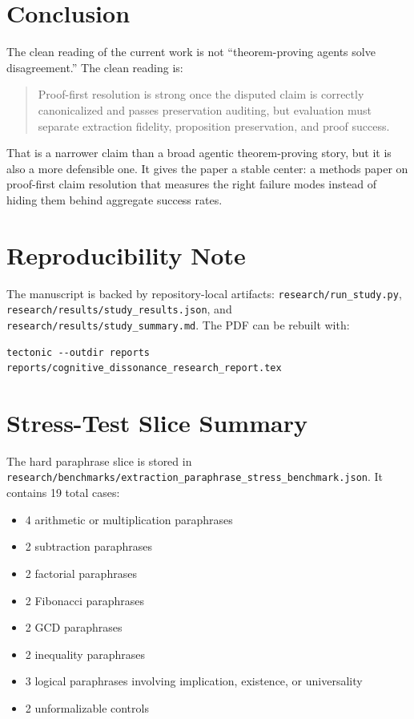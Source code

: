 \documentclass[11pt]{article}
\begin{document}
\section{Conclusion}

The clean reading of the current work is not ``theorem-proving agents solve
disagreement.'' The clean reading is:

\begin{quote}
Proof-first resolution is strong once the disputed claim is correctly
canonicalized and passes preservation auditing, but evaluation must separate
extraction fidelity, proposition preservation, and proof success.
\end{quote}

That is a narrower claim than a broad agentic theorem-proving story, but it is
also a more defensible one. It gives the paper a stable center: a methods
paper on proof-first claim resolution that measures the right failure modes
instead of hiding them behind aggregate success rates.

\section*{Reproducibility Note}

The manuscript is backed by repository-local artifacts:
\nolinkurl{research/run_study.py},
\nolinkurl{research/results/study_results.json}, and
\nolinkurl{research/results/study_summary.md}. The PDF can be rebuilt with:

\begin{verbatim}
tectonic --outdir reports reports/cognitive_dissonance_research_report.tex
\end{verbatim}

\appendix

\section{Stress-Test Slice Summary}

The hard paraphrase slice is stored in
\nolinkurl{research/benchmarks/extraction_paraphrase_stress_benchmark.json}.
It contains 19 total cases:

\begin{itemize}
  \item 4 arithmetic or multiplication paraphrases
  \item 2 subtraction paraphrases
  \item 2 factorial paraphrases
  \item 2 Fibonacci paraphrases
  \item 2 GCD paraphrases
  \item 2 inequality paraphrases
  \item 3 logical paraphrases involving implication, existence, or universality
  \item 2 unformalizable controls
\end{itemize}
\end{document}
